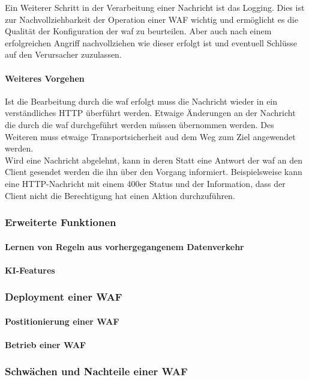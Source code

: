 Ein Weiterer Schritt in der Verarbeitung einer Nachricht ist das Logging.
Dies ist zur Nachvollziehbarkeit der Operation einer WAF wichtig und ermöglicht es die Qualität der Konfiguration der \ac{waf} zu beurteilen.
Aber auch nach einem erfolgreichen Angriff nachvollziehen wie dieser erfolgt ist und eventuell Schlüsse auf den Verursacher zuzulassen.

\paragraph{Weiteres Vorgehen}
% 

Ist die Bearbeitung durch die \ac{waf} erfolgt muss die Nachricht wieder in ein verständliches HTTP überführt werden.
Etwaige Änderungen an der Nachricht die durch die \ac{waf} durchgeführt werden müssen übernommen werden.
Des Weiteren muss etwaige Transportsicherheit aud dem Weg zum Ziel angewendet werden.\\

Wird eine Nachricht abgelehnt, kann in deren Statt eine Antwort der \ac{waf} an den Client gesendet werden die ihn über den Vorgang informiert.
Beispielsweise kann eine HTTP-Nachricht mit einem 400er Status und der Information, dass der Client nicht die Berechtigung hat einen Aktion durchzuführen.

\subsubsection{Erweiterte Funktionen}
\paragraph{Lernen von Regeln aus vorhergegangenem Datenverkehr}
\paragraph{KI-Features}
\subsubsection{Deployment einer WAF}
\paragraph{Postitionierung einer WAF}
\paragraph{Betrieb einer WAF}
\subsubsection{Schwächen und Nachteile einer WAF}
